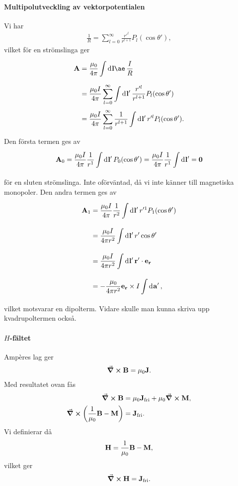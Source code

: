 \paragraph{Multipolutveckling av vektorpotentialen}
Vi har
\begin{align*}
	\frac{1}{R} = \sum\limits_{l = 0}^{\infty}\frac{r'^{l}}{r^{l + 1}}P_{l}(\cos{\theta'}),
\end{align*}
vilket för en strömslinga ger
\begin{align*}
	\vb{A} &= \frac{\mu_{0}}{4\pi}\integ{}{}{\vb{l}æ}{\frac{I}{R}} \\
	       &= \frac{\mu_{0}I}{4\pi}\sum\limits_{l = 0}^{\infty}\integ{}{}{\vb{l}'}{\frac{r'^{l}}{r^{l + 1}}P_{l}(\cos{\theta'})} \\
	       &= \frac{\mu_{0}I}{4\pi}\sum\limits_{l = 0}^{\infty}\frac{1}{r^{l + 1}}\integ{}{}{\vb{l}'}{r'^{l}P_{l}(\cos{\theta'})}.
\end{align*}
Den första termen ges av
\begin{align*}
	\vb{A}_{0} = \frac{\mu_{0}I}{4\pi}\frac{1}{r^{1}}\int\limits_{}^{}\dd[]{\vb{l}'}P_{0}(\cos{\theta'}) = \frac{\mu_{0}I}{4\pi}\frac{1}{r^{1}}\int\limits_{}^{}\dd[]{\vb{l}'} = \vb{0}
\end{align*}
för en sluten strömslinga. Inte oförväntad, då vi inte känner till magnetiska monopoler. Den andra termen ges av
\begin{align*}
	\vb{A}_{1} &= \frac{\mu_{0}I}{4\pi}\frac{1}{r^{2}}\int\limits_{}^{}\dd[]{\vb{l}'}r'^{1}P_{1}(\cos{\theta'}) \\
	           &= \frac{\mu_{0}I}{4\pi r^{2}}\int\limits_{}^{}\dd[]{\vb{l}'}r'\cos{\theta'} \\
	           &= \frac{\mu_{0}I}{4\pi r^{2}}\int\limits_{}^{}\dd[]{\vb{l}'}\vb{r}'\cdot\vb{e}_{\vb{r}} \\
	           &= -\frac{\mu_{0}}{4\pi r^{2}}\vb{e}_{\vb{r}}\times I\int\limits_{}^{}\dd[]{\vb{a}'},
\end{align*}
vilket motsvarar en dipolterm. Vidare skulle man kunna skriva upp kvadrupoltermen också.

\paragraph{$H$-fältet}
Ampères lag ger
\begin{align*}
	\curl{\vb{B}} = \mu_{0}\vb{J}.
\end{align*}
Med resultatet ovan fås
\begin{align*}
	\curl{\vb{B}}                           &= \mu_{0}\vb{J}_{\text{fri}} + \mu_{0}\curl{\vb{M}}, \\
	\curl(\frac{1}{\mu_{0}}\vb{B} - \vb{M}) &= \vb{J}_{\text{fri}}.
\end{align*}
Vi definierar då
\begin{align*}
	\vb{H} = \frac{1}{\mu_{0}}\vb{B} - \vb{M},
\end{align*}
vilket ger
\begin{align*}
	\curl{\vb{H}} = \vb{J}_{\text{fri}}.
\end{align*}

